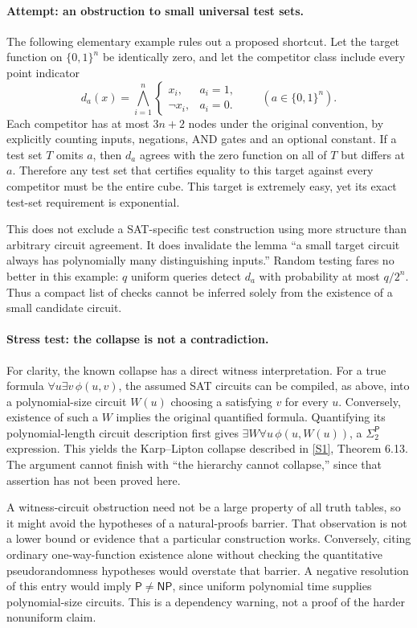 \documentclass[11pt,a4paper]{article}
\newcommand{\sref}[2]{\hyperlink{source:#1:#2}{[S#2]}}
\begin{document}
\paragraph{Attempt: an obstruction to small universal test sets.}
The following elementary example rules out a proposed shortcut. Let the
target function on $\{0,1\}^n$ be identically zero, and let the competitor
class include every point indicator
\[
 d_a(x)=\bigwedge_{i=1}^n
 \begin{cases}x_i,&a_i=1,\\ \neg x_i,&a_i=0.\end{cases}
 \qquad(a\in\{0,1\}^n).
\]
Each competitor has at most $3n+2$ nodes under the original convention,
by explicitly counting inputs, negations, AND gates and an optional
constant. If a test set $T$ omits $a$, then $d_a$ agrees with the zero
function on all of $T$ but differs at $a$. Therefore any test set that
certifies equality to this target against every competitor must be the
entire cube. This target is extremely easy, yet its exact test-set
requirement is exponential.

This does not exclude a SAT-specific test construction using more
structure than arbitrary circuit agreement. It does invalidate the
lemma ``a small target circuit always has polynomially many distinguishing
inputs.'' Random testing fares no better in this example: $q$ uniform
queries detect $d_a$ with probability at most $q/2^n$. Thus a compact
list of checks cannot be inferred solely from the existence of a small
candidate circuit.

\paragraph{Stress test: the collapse is not a contradiction.}
For clarity, the known collapse has a direct witness interpretation.
For a true formula $\forall u\exists v\,\phi(u,v)$, the assumed SAT
circuits can be compiled, as above, into a polynomial-size circuit
$W(u)$ choosing a satisfying $v$ for every $u$. Conversely, existence of
such a $W$ implies the original quantified formula. Quantifying its
polynomial-length circuit description first gives
$\exists W\forall u\,\phi(u,W(u))$, a $\Sigma_2^{\mathsf P}$ expression.
This yields the Karp--Lipton collapse described in \sref{30006678}{1},
Theorem 6.13. The argument cannot finish with ``the hierarchy cannot
collapse,'' since that assertion has not been proved here.

A witness-circuit obstruction need not be a large property of all truth
tables, so it might avoid the hypotheses of a natural-proofs barrier.
That observation is not a lower bound or evidence that a particular
construction works. Conversely, citing ordinary one-way-function
existence alone without checking the quantitative pseudorandomness
hypotheses would overstate that barrier. A negative resolution of this
entry would imply $\mathsf P\ne\mathsf{NP}$, since uniform polynomial
time supplies polynomial-size circuits. This is a dependency warning,
not a proof of the harder nonuniform claim.
\end{document}
